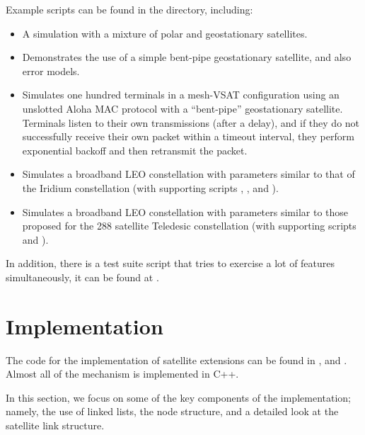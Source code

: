 Example scripts can be found in the  directory, including:
\begin{itemize}
\item {}  A simulation with a mixture of polar and
geostationary satellites.
\item {}  Demonstrates the use of a simple bent-pipe
geostationary satellite, and also error models.
\item {}  Simulates one hundred terminals in a mesh-VSAT
configuration using an unslotted Aloha MAC protocol 
with a ``bent-pipe'' geostationary satellite.  Terminals listen to their
own transmissions (after a delay), and if they do not successfully receive
their own packet within a timeout interval, they perform exponential 
backoff and then retransmit the packet. 
\item {}  Simulates a broadband LEO constellation with
parameters similar to that of the Iridium constellation (with supporting
scripts , , 
and ).
\item {}  Simulates a broadband LEO constellation with
parameters similar to those proposed for the 288 satellite Teledesic
constellation (with supporting scripts  and 
).
\end{itemize}
In addition, there is a test suite script that tries to exercise a lot
of features simultaneously, it can be found at .


\section{Implementation}
\label{sec:satellite/implementation}

The code for the implementation of satellite extensions can be found
in , and
.  Almost all of the mechanism is implemented
in C++.

In this section, we focus on some of the key components of the implementation;
namely, the use of linked lists, the node structure, and a detailed look
at the satellite link structure.

